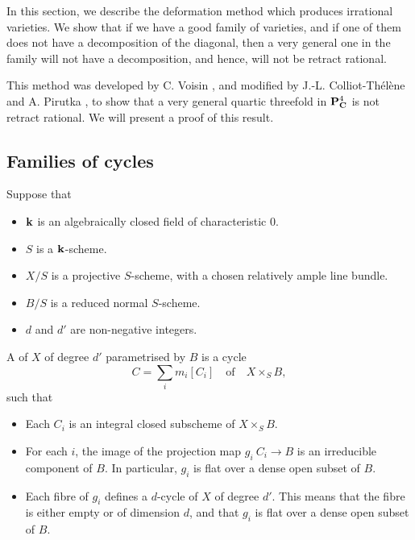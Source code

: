 In this section, we describe the deformation method
which produces irrational varieties.
We show that if we have a good family of varieties,
and if one of them does not have a decomposition of the diagonal,
then a very general one in the family
will not have a decomposition, and hence, will not be retract rational.

This method was developed by C. Voisin \cite{voisin},
and modified by J.\nobreakdash-L. Colliot-Thélène and A. Pirutka \cite{CTP},
to show that a very general
quartic threefold in $\bbP_{\bbC}^4$ is not retract rational.
We will present a proof of this result.


\subsection{Families of cycles}

\begin{definition}  \label{def-3-family}
    Suppose that
    \begin{itemize}
        \item
            $\bbk$ is an algebraically closed field of characteristic $0$.
        \item
            $S$ is a $\bbk$-scheme.
        \item
            $X/S$ is a projective $S$-scheme, with a chosen relatively ample line bundle.
        \item
            $B/S$ is a reduced normal $S$-scheme.
        \item
            $d$ and $d'$ are non-negative integers.
    \end{itemize}
    A  of $X$ of degree $d'$ parametrised by $B$
    is a cycle 
    \[ \textstyle C = \sum_i m_i [C_i] \quad \text{of} \quad X \times_S B, \]
    such that
    \begin{itemize}
        \item
            Each $C_i$ is an integral closed subscheme of $X \times_S B$.
        \item
            For each $i$, the image of the projection map $g_i \: C_i \to B$
            is an irreducible component of $B$.
            In particular, $g_i$ is flat over a dense open subset of $B$.
        \item
            Each fibre of $g_i$ defines a $d$-cycle of $X$ of degree $d'$.
            This means that the fibre is either empty or of dimension $d$,
            and that $g_i$ is flat over a dense open subset of $B$.
    \end{itemize}
\end{definition}

